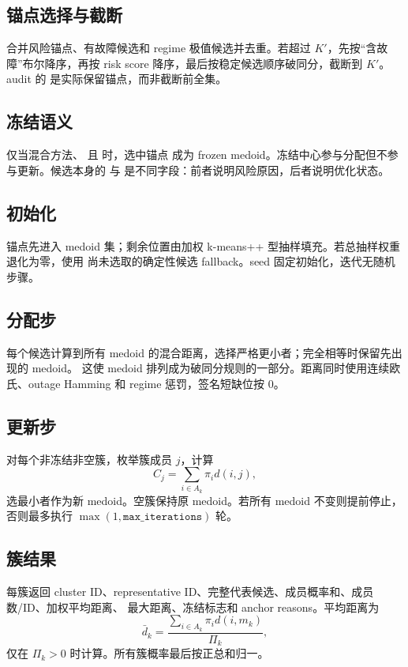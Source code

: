 \subsection{锚点选择与截断}
 合并风险锚点、有故障候选和 regime 极值候选并去重。若超过
$K'$，先按“含故障”布尔降序，再按 risk score 降序，最后按稳定候选顺序破同分，截断到
$K'$。audit 的  是实际保留锚点，而非截断前全集。

\subsection{冻结语义}
仅当混合方法、 且  时，选中锚点
成为 frozen medoid。冻结中心参与分配但不参与更新。候选本身的  与
 是不同字段：前者说明风险原因，后者说明优化状态。

\subsection{初始化}
锚点先进入 medoid 集；剩余位置由加权 k-means++ 型抽样填充。若总抽样权重退化为零，使用
尚未选取的确定性候选 fallback。seed 固定初始化，迭代无随机步骤。

\subsection{分配步}
每个候选计算到所有 medoid 的混合距离，选择严格更小者；完全相等时保留先出现的 medoid。
这使 medoid 排列成为破同分规则的一部分。距离同时使用连续欧氏、outage Hamming 和 regime
惩罚，签名短缺位按 0。

\subsection{更新步}
对每个非冻结非空簇，枚举簇成员 $j$，计算
\begin{equation}
 C_j=\sum_{i\in A_k}\pi_i d(i,j),
\end{equation}
选最小者作为新 medoid。空簇保持原 medoid。若所有 medoid 不变则提前停止，否则最多执行
$\max(1,\texttt{max\_iterations})$ 轮。

\subsection{簇结果}
每簇返回 cluster ID、representative ID、完整代表候选、成员概率和、成员数/ID、加权平均距离、
最大距离、冻结标志和 anchor reasons。平均距离为
\begin{equation}
 \bar d_k=\frac{\sum_{i\in A_k}\pi_i d(i,m_k)}{\Pi_k},
\end{equation}
仅在 $\Pi_k>0$ 时计算。所有簇概率最后按正总和归一。

